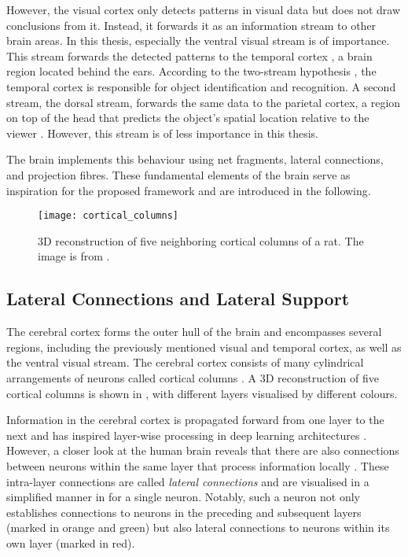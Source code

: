 However, the visual cortex only detects patterns in visual data but does not draw conclusions from it. Instead, it forwards it as an information stream to other brain areas. In this thesis, especially the ventral visual stream is of importance. This stream forwards the detected patterns to the temporal cortex , a brain region located behind the ears.
According to the two-stream hypothesis , the temporal cortex is responsible for object identification and recognition. A second stream, the dorsal stream, forwards the same data to the parietal cortex, a region on top of the head that predicts the object's spatial location relative to the viewer . However, this stream is of less importance in this thesis.

The brain implements this behaviour using net fragments, lateral connections, and projection fibres. These fundamental elements of the brain serve as inspiration for the proposed framework and are introduced in the following.

\begin{figure}[h]
    \centering
    \texttt{[image: cortical\_columns]}
    \caption[3D reconstruction of five neighbouring cortical columns]{3D reconstruction of five neighboring cortical columns of a rat. The image is from .}
\end{figure}

\subsection{Lateral Connections and Lateral Support}
The cerebral cortex forms the outer hull of the brain \cite{narr_relationships_2007} and encompasses several regions, including the previously mentioned visual and temporal cortex, as well as the ventral visual stream.
The cerebral cortex consists of many cylindrical arrangements of neurons called cortical columns .
A 3D reconstruction of five cortical columns is shown in , with different layers visualised by different colours.

Information in the cerebral cortex is propagated forward from one layer to the next and has inspired layer-wise processing in deep learning architectures .
However, a closer look at the human brain reveals that there are also connections between neurons within the same layer that process information locally .
These intra-layer connections are called \emph{lateral connections} and are visualised in a simplified manner in  for a single neuron.
Notably, such a neuron not only establishes connections to neurons in the preceding and subsequent layers (marked in orange and green) but also lateral connections to neurons within its own layer (marked in red).

